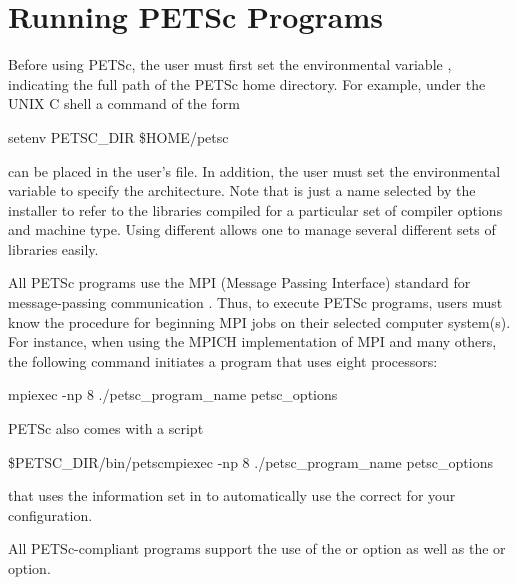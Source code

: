 \section{Running PETSc Programs}
\label{sec_running}

Before using PETSc, the user must first set the environmental variable
,  indicating the full path of the PETSc home
directory.  For example, under the UNIX C shell a command of the form
\begin{tabbing}
   setenv PETSC\_DIR \$HOME/petsc
\end{tabbing}
 can be placed in the user's  file.  In addition, the user must set the environmental
variable {} to specify the architecture. Note that
{} is just a name selected by the installer to refer to
the libraries compiled for a particular set of compiler options and 
machine type. Using different {} allows one to manage
several different sets of libraries easily.

All PETSc programs use the MPI (Message Passing Interface) standard
for message-passing communication \cite{MPI-final}.  Thus, to execute
PETSc programs, users must know the procedure for beginning MPI jobs
on their selected computer system(s).  For instance, when using the
MPICH implementation of MPI \cite{mpich-web-page} and many others, the following
command initiates a program that uses eight processors:
  
\begin{tabbing}
   mpiexec -np 8 ./petsc\_program\_name petsc\_options
\end{tabbing}

PETSc also comes with a script 
\begin{tabbing}
   \${PETSC\_DIR}/bin/petscmpiexec -np 8 ./petsc\_program\_name petsc\_options
\end{tabbing}
that uses the information set in  to 
automatically use the correct  for your configuration.

All PETSc-compliant programs support the use of the 
 or  option as well as the  
or  option. 


